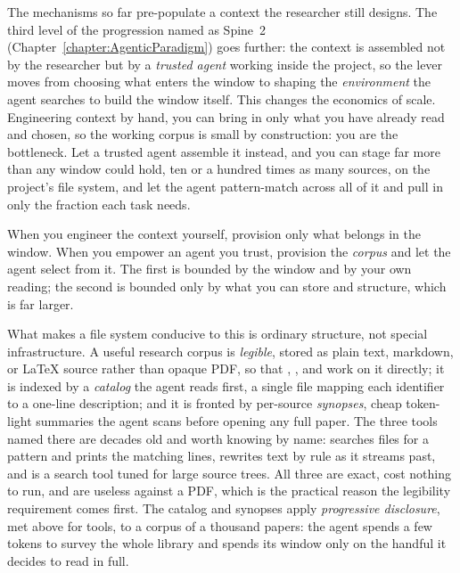 The mechanisms so far pre-populate a context the researcher still designs.
The third level of the progression named as Spine~2 (Chapter~\ref{chapter:AgenticParadigm}) goes further: the context is assembled not by the researcher but by a \emph{trusted agent} working inside the project, so the lever moves from choosing what enters the window to shaping the \emph{environment} the agent searches to build the window itself.
This changes the economics of scale.
Engineering context by hand, you can bring in only what you have already read and chosen, so the working corpus is small by construction: you are the bottleneck.
Let a trusted agent assemble it instead, and you can stage far more than any window could hold, ten or a hundred times as many sources, on the project's file system, and let the agent pattern-match across all of it and pull in only the fraction each task needs.

\begin{principle}
\label{principle:StageNotInject}
When you engineer the context yourself, provision only what belongs in the window.
When you empower an agent you trust, provision the \emph{corpus} and let the agent select from it.
The first is bounded by the window and by your own reading; the second is bounded only by what you can store and structure, which is far larger.
\end{principle}

What makes a file system conducive to this is ordinary structure, not special infrastructure.
A useful research corpus is \emph{legible}, stored as plain text, markdown, or \LaTeX{} source rather than opaque PDF, so that , , and  work on it directly; it is indexed by a \emph{catalog} the agent reads first, a single file mapping each identifier to a one-line description; and it is fronted by per-source \emph{synopses}, cheap token-light summaries the agent scans before opening any full paper.
The three tools named there are decades old and worth knowing by name:  searches files for a pattern and prints the matching lines,  rewrites text by rule as it streams past, and  is a search tool tuned for large source trees.
All three are exact, cost nothing to run, and are useless against a PDF, which is the practical reason the legibility requirement comes first.
The catalog and synopses apply \emph{progressive disclosure}, met above for tools, to a corpus of a thousand papers: the agent spends a few tokens to survey the whole library and spends its window only on the handful it decides to read in full.

